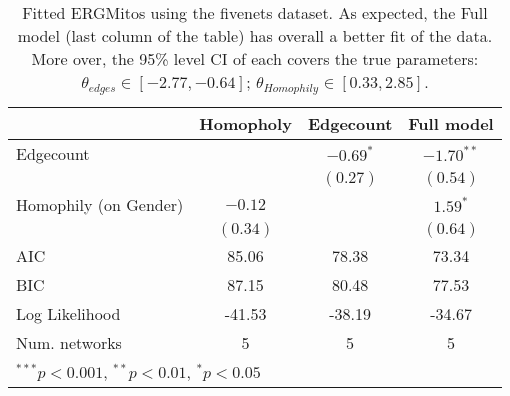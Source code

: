 
\begin{table}
\begin{center}
\begin{tabular}{l c c c }
\hline
 & Homopholy & Edgecount & Full model \\
\hline
Edgecount             &          & $-0.69^{*}$ & $-1.70^{**}$ \\
                      &          & $(0.27)$    & $(0.54)$     \\
Homophily (on Gender) & $-0.12$  &             & $1.59^{*}$   \\
                      & $(0.34)$ &             & $(0.64)$     \\
\hline
AIC                   & 85.06    & 78.38       & 73.34        \\
BIC                   & 87.15    & 80.48       & 77.53        \\
Log Likelihood        & -41.53   & -38.19      & -34.67       \\
Num. networks         & 5        & 5           & 5            \\
\hline
\multicolumn{4}{l}{\scriptsize{$^{***}p<0.001$, $^{**}p<0.01$, $^*p<0.05$}}
\end{tabular}
\caption{Fitted ERGMitos using the fivenets dataset. As expected, the Full model (last column of the table) has overall a better fit of the data. More over, the 95\% level CI of each covers the true parameters: $\theta_{edges} \in [-2.77, -0.64]$; $\theta_{Homophily} \in [0.33, 2.85]$.}
\label{table:coefficients}
\end{center}
\end{table}
